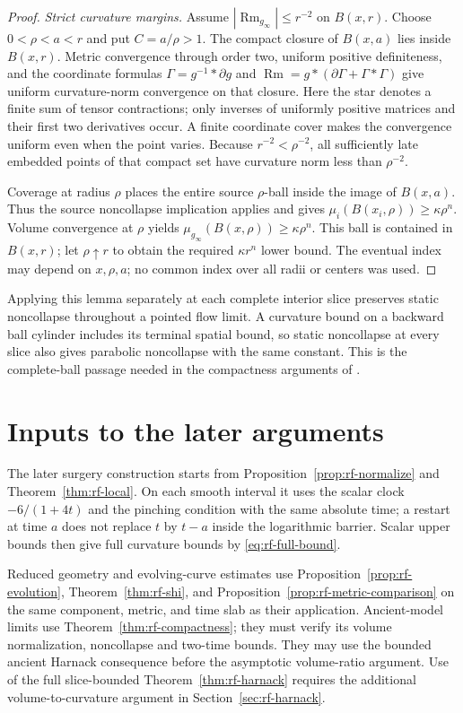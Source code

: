 \begin{proof}
\emph{Strict curvature margins.}
Assume $|\operatorname{Rm}_{g_\infty}|\leq r^{-2}$ on $B(x,r)$.
Choose $0<\rho<a<r$ and put $C=a/\rho>1$.
The compact closure of $B(x,a)$ lies inside $B(x,r)$.
Metric convergence through order two, uniform positive
definiteness, and the coordinate formulas
$\Gamma=g^{-1}*\partial g$ and
$\operatorname{Rm}=g*(\partial\Gamma+\Gamma*\Gamma)$
give uniform curvature-norm convergence on that closure.
Here the star denotes a finite sum of tensor contractions;
only inverses of uniformly positive matrices and their first
two derivatives occur.  A finite coordinate cover makes
the convergence uniform even when the point varies.
Because $r^{-2}<\rho^{-2}$, all sufficiently late embedded
points of that compact set have curvature norm less than
$\rho^{-2}$.

Coverage at radius $\rho$ places the entire source $\rho$-ball
inside the image of $B(x,a)$.  Thus the source noncollapse
implication applies and gives
$\mu_i(B(x_i,\rho))\geq\kappa\rho^n$.
Volume convergence at $\rho$ yields
$\mu_{g_\infty}(B(x,\rho))\geq\kappa\rho^n$.
This ball is contained in $B(x,r)$; let $\rho\uparrow r$ to
obtain the required $\kappa r^n$ lower bound.
The eventual index may depend on $x,\rho,a$; no common index
over all radii or centers was used.
\end{proof}

Applying this lemma separately at each complete interior slice
preserves static noncollapse throughout a pointed flow limit.
A curvature bound on a backward ball cylinder includes its
terminal spatial bound, so static noncollapse at every slice
also gives parabolic noncollapse with the same constant.
This is the complete-ball passage needed in the compactness
arguments of \cite[Corollary 44.1, pp. 2682--2683, and
Appendix E, pp. 2848--2849]{KleinerLott2013}.

\section{Inputs to the later arguments}
\label{sec:rf-interfaces}

The later surgery construction starts from
Proposition~\ref{prop:rf-normalize} and
Theorem~\ref{thm:rf-local}.  On each smooth interval it uses the
scalar clock $-6/(1+4t)$ and the pinching condition with the same
absolute time; a restart at time $a$ does not replace $t$ by $t-a$
inside the logarithmic barrier.  Scalar upper bounds then give full
curvature bounds by \eqref{eq:rf-full-bound}.

Reduced geometry and evolving-curve estimates use
Proposition~\ref{prop:rf-evolution},
Theorem~\ref{thm:rf-shi}, and
Proposition~\ref{prop:rf-metric-comparison} on the same component,
metric, and time slab as their application.  Ancient-model limits
use Theorem~\ref{thm:rf-compactness}; they must verify its volume
normalization, noncollapse and two-time bounds.  They may use the
bounded ancient Harnack consequence before the asymptotic
volume-ratio argument.  Use of the full slice-bounded
Theorem~\ref{thm:rf-harnack} requires the additional volume-to-curvature
argument in Section~\ref{sec:rf-harnack}.
